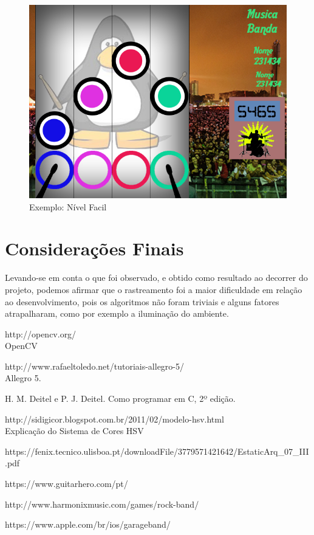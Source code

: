 \documentclass{sciposter}
\begin{document}
\begin{multicols}{3}
\begin{figure}[!htb]
\centering
\includegraphics[scale=2.3]{mediumCase.png}
\caption{Exemplo: Nível Facil}
\end{figure}


\section{Considerações Finais}
Levando-se em conta o que foi observado, e obtido como resultado ao decorrer do projeto, podemos afirmar que o rastreamento foi a maior dificuldade em relação ao desenvolvimento, pois os algoritmos não foram triviais e alguns fatores atrapalharam, como por exemplo a iluminação do ambiente. 



\begin{thebibliography}{9}

http://opencv.org/ \\
\newblock OpenCV

 http://www.rafaeltoledo.net/tutoriais-allegro-5/ \\
\newblock Allegro 5.

H. M. Deitel e P. J. Deitel.
\newblock Como programar em C, 2º edição.

\bibitem *http://sidigicor.blogspot.com.br/2011/02/modelo-hsv.html \\
\newblok Explicação do Sistema de Cores HSV

\bibitem *https://fenix.tecnico.ulisboa.pt/downloadFile/3779571421642/EstaticArq\_07\_III.pdf \\

\bibitem *https://www.guitarhero.com/pt/ \\

\bibitem *http://www.harmonixmusic.com/games/rock-band/ \\

\bibitem *https://www.apple.com/br/ios/garageband/ \\
\end{thebibliography}

\end{multicols}
\end{document}
